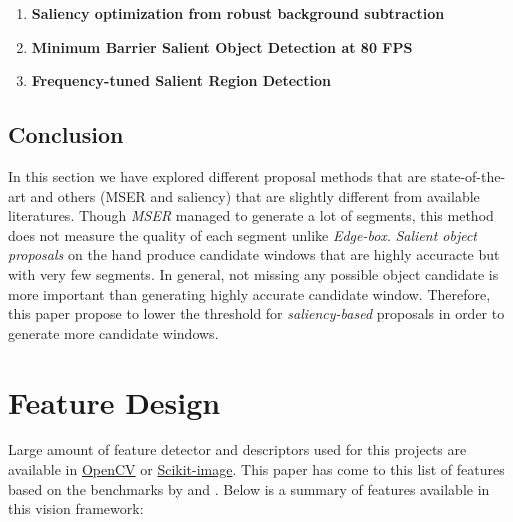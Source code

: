 \documentclass[fypca]{socreport}
\begin{document}
\begin{enumerate}
  \item \textbf{Saliency optimization from robust background subtraction} 
  \item \textbf{Minimum Barrier Salient Object Detection at 80 FPS} 
  \item \textbf{Frequency-tuned Salient Region Detection} 
\end{enumerate}

\section{Conclusion}

In this section we have explored different proposal methods that are
state-of-the-art and others (MSER and saliency) that are slightly different from
available literatures. Though \textit{MSER} managed to generate a lot of
segments, this method does not measure the quality of each segment unlike
\textit{Edge-box}. \textit{Salient object proposals} on the hand produce
candidate windows that are highly accuracte but with very few segments. In
general, not missing any possible object candidate is more important than
generating highly accurate candidate window. Therefore, this paper propose to
lower the threshold for \textit{saliency-based} proposals in order to generate
more candidate windows.


\chapter{Feature Design}

Large amount of feature detector and descriptors used for this projects are available in
\href{http://opencv.org/}{OpenCV} or
\href{http://scikit-image.org/}{Scikit-image}. This paper has come to this list
of features based on the benchmarks by  and .
Below is a summary of features available in this vision framework:
\end{document}
